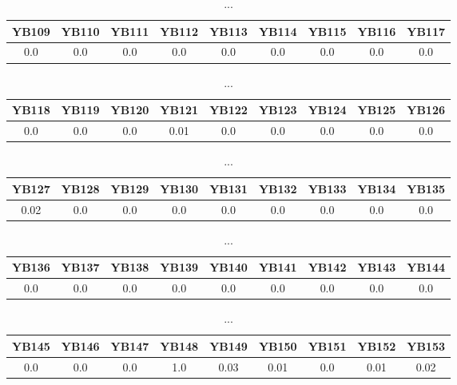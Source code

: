\documentclass[]{article}
\begin{document}
\begin{table}[h]
      \centering
      \begin{tabular}{|c|c|c|c|c|c|c|c|c|}
            \hline
            YB109 & YB110 & YB111 & YB112 & YB113 & YB114 & YB115 & YB116 & YB117 \\
            \hline
            0.0   & 0.0   & 0.0   & 0.0   & 0.0   & 0.0   & 0.0   & 0.0   & 0.0   \\
            \hline
      \end{tabular}
      \caption{...}
\end{table}
\begin{table}[h]
      \centering
      \begin{tabular}{|c|c|c|c|c|c|c|c|c|}
            \hline
            YB118 & YB119 & YB120 & YB121 & YB122 & YB123 & YB124 & YB125 & YB126 \\
            \hline
            0.0   & 0.0   & 0.0   & 0.01  & 0.0   & 0.0   & 0.0   & 0.0   & 0.0   \\
            \hline
      \end{tabular}
      \caption{...}
\end{table}
\begin{table}[h]
      \centering
      \begin{tabular}{|c|c|c|c|c|c|c|c|c|}
            \hline
            YB127 & YB128 & YB129 & YB130 & YB131 & YB132 & YB133 & YB134 & YB135 \\
            \hline
            0.02  & 0.0   & 0.0   & 0.0   & 0.0   & 0.0   & 0.0   & 0.0   & 0.0   \\
            \hline
      \end{tabular}
      \caption{...}
\end{table}
\begin{table}[h]
      \centering
      \begin{tabular}{|c|c|c|c|c|c|c|c|c|}
            \hline
            YB136 & YB137 & YB138 & YB139 & YB140 & YB141 & YB142 & YB143 & YB144 \\
            \hline
            0.0   & 0.0   & 0.0   & 0.0   & 0.0   & 0.0   & 0.0   & 0.0   & 0.0   \\
            \hline
      \end{tabular}
      \caption{...}
\end{table}
\begin{table}[h]
      \centering
      \begin{tabular}{|c|c|c|c|c|c|c|c|c|}
            \hline
            YB145 & YB146 & YB147 & YB148 & YB149 & YB150 & YB151 & YB152 & YB153 \\
            \hline
            0.0   & 0.0   & 0.0   & 1.0   & 0.03  & 0.01  & 0.0   & 0.01  & 0.02  \\
            \hline
      \end{tabular}
      \caption{...}
\end{table}
\end{document}
